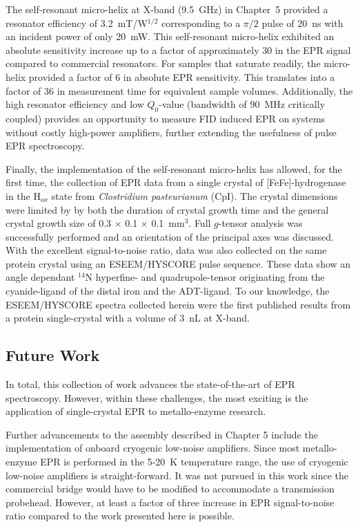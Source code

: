 The self-resonant micro-helix at X-band (9.5~GHz) in Chapter~5 provided a resonator efficiency of 3.2~mT/W$^{1/2}$ corresponding to a $\pi/2$ pulse of 20~ns with an incident power of only 20~mW. This self-resonant micro-helix exhibited an absolute sensitivity increase up to a factor of approximately 30 in the EPR signal compared to commercial resonators. For samples that saturate readily, the micro-helix provided a factor of 6 in absolute EPR sensitivity. This translates into a factor of 36 in measurement time for equivalent sample volumes. Additionally, the high resonator efficiency and low $Q_0$-value (bandwidth of 90~MHz critically coupled) provides an opportunity to measure FID induced EPR on systems without costly high-power amplifiers, further extending the usefulness of pulse EPR spectroscopy.

Finally, the implementation of the self-resonant micro-helix has allowed, for the first time, the collection of EPR data from a single crystal of [FeFe]-hydrogenase in the H$_{ox}$ state from {\em Clostridium pasteurianum} (CpI). The crystal dimensions were limited by by both the duration of crystal growth time and the general crystal growth size of 0.3 $\times$ 0.1 $\times$ 0.1~mm$^3$. Full $g$-tensor analysis was successfully performed and an orientation of the principal axes was discussed. With the excellent signal-to-noise ratio, data was also collected on the same protein crystal using an ESEEM/HYSCORE pulse sequence. These data show an angle dependant $^{14}$N hyperfine- and quadrupole-tensor originating from the cyanide-ligand of the distal iron and the ADT-ligand. To our knowledge, the ESEEM/HYSCORE spectra collected herein were the first published results from a protein single-crystal with a volume of 3~nL at X-band. 

\subsection*{Future Work}

In total, this collection of work advances the state-of-the-art of EPR spectroscopy. However, within these challenges, the most exciting is the application of single-crystal EPR to metallo-enzyme research. 

Further advancements to the assembly described in Chapter 5 include the implementation of onboard cryogenic low-noise amplifiers. Since most metallo-enzyme EPR is performed in the 5-20~K temperature range, the use of cryogenic low-noise amplifiers is straight-forward. It was not pursued in this work since the commercial bridge would have to be modified to accommodate a transmission probehead. However, at least a factor of three increase in EPR signal-to-noise ratio compared to the work presented here is possible. \cite{NARKOWICZ201379} 

